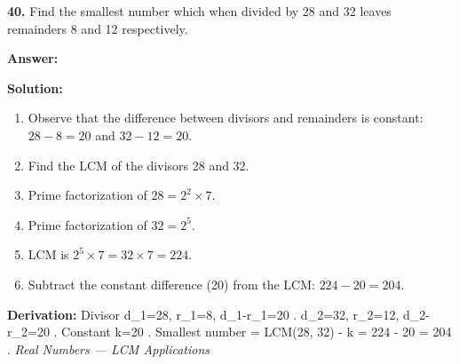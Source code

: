\documentclass[12pt,a4paper]{exam}
\newcommand{\fitmath}[1]{%
  \sbox{\schmathbox}{$\displaystyle #1$}%
  \ifdim\wd\schmathbox>\linewidth
    \resizebox{\linewidth}{!}{\usebox{\schmathbox}}%
  \else
    \usebox{\schmathbox}%
  \fi}
\begin{document}
\begin{questions}
\question \textbf{40.} Find the smallest number which when divided by 28 and 32 leaves remainders 8 and 12 respectively.

\textbf{Answer:}
\begin{center}
\fitmath{204}
\end{center}

\textbf{Solution:}
\begin{enumerate}
  \item Observe that the difference between divisors and remainders is constant: $28 - 8 = 20$ and $32 - 12 = 20$.
  \item Find the LCM of the divisors 28 and 32.
  \item Prime factorization of $28 = 2^2 \times 7$.
  \item Prime factorization of $32 = 2^5$.
  \item LCM is $2^5 \times 7 = 32 \times 7 = 224$.
  \item Subtract the constant difference (20) from the LCM: $224 - 20 = 204$.
\end{enumerate}
\textbf{Derivation:}
Divisor  d\_1=28, r\_1=8, d\_1-r\_1=20 .  d\_2=32, r\_2=12, d\_2-r\_2=20 . Constant  k=20 . Smallest number  = LCM(28, 32) - k = 224 - 20 = 204 .
\hfill \textit{Real Numbers — LCM Applications}
\vspace{0.3cm}

\end{questions}
\end{document}
